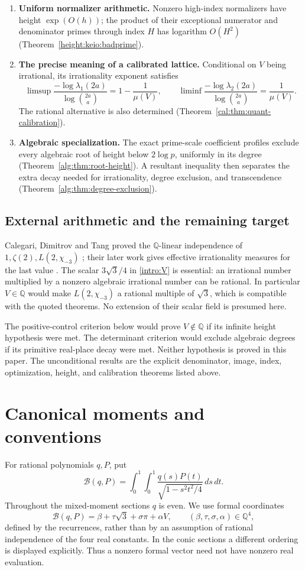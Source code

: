 \documentclass[11pt,a4paper]{article}
\numberwithin{equation}{section}
\theoremstyle{definition}\newtheorem{definition}[theorem]{Definition}
\theoremstyle{remark}\newtheorem{remark}[theorem]{Remark}
\newcommand{\Q}{\mathbb Q}\newcommand{\Z}{\mathbb Z}\newcommand{\R}{\mathbb R}
\newcommand{\B}{\mathcal B}\newcommand{\N}{\mathcal N}\newcommand{\M}{\mathcal M}
\begin{document}
\begin{enumerate}
from $0.9175241689\ldots$ to $1.1755429311\ldots$
(Theorem~\ref{opt:taisho:main}). The necessary infinite sequence of controls
is not constructed here.
\item \textbf{Uniform normalizer arithmetic.}
Nonzero high-index normalizers have height $\exp(O(h))$; the product of
their exceptional numerator and denominator primes through index $H$
has logarithm $O(H^2)$ (Theorem~\ref{height:keio:badprime}).
\item \textbf{The precise meaning of a calibrated lattice.}
Conditional on $V$ being irrational, its irrationality exponent satisfies
\[
 \limsup\frac{-\log\lambda_1(2a)}{\log\binom{2a}{a}}
       =1-\frac1{\mu(V)},\qquad
 \liminf\frac{-\log\lambda_2(2a)}{\log\binom{2a}{a}}
       =\frac1{\mu(V)}.
\]
The rational alternative is also determined
(Theorem~\ref{cal:thm:quant-calibration}).
\item \textbf{Algebraic specialization.}
The exact prime-scale coefficient profiles exclude every algebraic root of
height below $2\log p$, uniformly in its degree
(Theorem~\ref{alg:thm:root-height}). A resultant inequality then separates
the extra decay needed for irrationality, degree exclusion, and
transcendence (Theorem~\ref{alg:thm:degree-exclusion}).
\end{enumerate}

\subsection{External arithmetic and the remaining target}
Calegari, Dimitrov and Tang proved the $\Q$-linear independence of
$1,\zeta(2),L(2,\chi_{-3})$ \cite{CDT24}; their later work gives effective
irrationality measures for the last value \cite{CDT25}. The scalar
$3\sqrt3/4$ in \eqref{intro:V} is essential: an irrational number multiplied
by a nonzero algebraic irrational number can be rational. In particular
$V\in\Q$ would make $L(2,\chi_{-3})$ a rational multiple of $\sqrt3$,
which is compatible with the quoted theorems. No extension of their
scalar field is presumed here.

The positive-control criterion below would prove $V\notin\Q$ if its
infinite height hypothesis were met. The determinant criterion would
exclude algebraic degrees if its primitive real-place decay were met.
Neither hypothesis is proved in this paper. The unconditional results
are the explicit denominator, image, index, optimization, height, and
calibration theorems listed above.

\section{Canonical moments and conventions}
For rational polynomials $q,P$, put
\[
 \B(q,P)=\int_0^1\!\int_0^1
          \frac{q(s)P(t)}{\sqrt{1-s^2t^2/4}}\,ds\,dt.
\]
Throughout the mixed-moment sections $q$ is even. We use formal coordinates
\[
 \B(q,P)=\beta+\tau\sqrt3+\sigma\pi+\alpha V,
 \qquad (\beta,\tau,\sigma,\alpha)\in\Q^4,
\]
defined by the recurrences, rather than by an assumption of rational
independence of the four real constants. In the conic sections a different
ordering is displayed explicitly. Thus a nonzero formal vector need not
have nonzero real evaluation.
\end{document}

